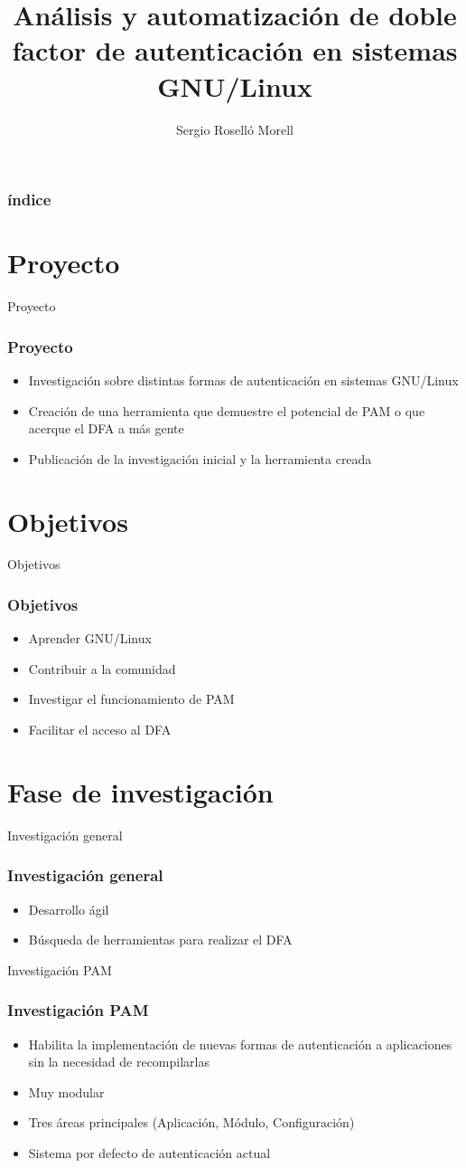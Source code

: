 \documentclass{beamer}
\title{Análisis y automatización de doble factor de autenticación en sistemas GNU/Linux}
\author{Sergio Roselló Morell}
\begin{document}
\frame{\titlepage}

\begin{frame}
\frametitle{índice}
\tableofcontents
\end{frame}
\section{Proyecto}
\begin{frame}{Proyecto}
\frametitle{Proyecto}
\begin{itemize}
	\item Investigación sobre distintas formas de autenticación en sistemas GNU/Linux
	\item Creación de una herramienta que demuestre el potencial de PAM o que acerque el DFA a más gente
	\item Publicación de la investigación inicial y la herramienta creada
\end{itemize}
\end{frame}
\section{Objetivos}
\begin{frame}{Objetivos}
	\frametitle{Objetivos}
	\begin{itemize}
		\item Aprender GNU/Linux
		\item Contribuir a la comunidad
		\item Investigar el funcionamiento de PAM
		\item Facilitar el acceso al DFA
	\end{itemize}
\end{frame}
\section{Fase de investigación}
\begin{frame}{Investigación general}
	\frametitle{Investigación general}
	\begin{itemize}
		\item Desarrollo ágil
		\item Búsqueda de herramientas para realizar el DFA
	\end{itemize}
\end{frame}
\begin{frame}{Investigación PAM}
	\frametitle{Investigación PAM}
	\begin{itemize}
		\item Habilita la implementación de nuevas formas de autenticación a aplicaciones sin la necesidad de recompilarlas
		\item Muy modular
		\item Tres áreas principales (Aplicación, Módulo, Configuración)
		\item Sistema por defecto de autenticación actual
	\end{itemize}
\end{frame}
\end{document}
